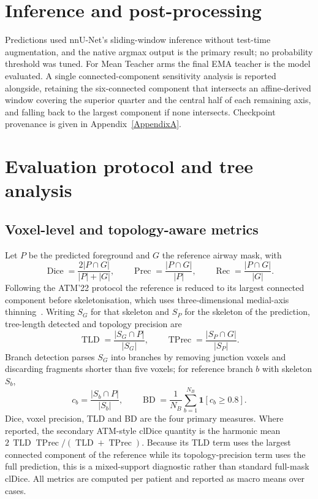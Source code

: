 \section{Inference and post-processing}

Predictions used nnU-Net's sliding-window inference without test-time augmentation, and the
native argmax output is the primary result; no probability threshold was tuned. For Mean
Teacher arms the final EMA teacher is the model evaluated. A single connected-component
sensitivity analysis is reported alongside, retaining the six-connected component that
intersects an affine-derived window covering the superior quarter and the central half of each
remaining axis, and falling back to the largest component if none intersects. Checkpoint
provenance is given in Appendix~\ref{AppendixA}.

\section{Evaluation protocol and tree analysis}
\label{sec:evaluation}

\subsection{Voxel-level and topology-aware metrics}

Let $P$ be the predicted foreground and $G$ the reference airway mask, with
\begin{equation}
  \operatorname{Dice}=\frac{2|P\cap G|}{|P|+|G|},
  \qquad
  \operatorname{Prec}=\frac{|P\cap G|}{|P|},
  \qquad
  \operatorname{Rec}=\frac{|P\cap G|}{|G|}.
  \label{eq:voxel}
\end{equation}
Following the ATM'22 protocol the reference is reduced to its largest connected component
before skeletonisation, which uses three-dimensional medial-axis thinning~\cite{lee1994thinning}. Writing $S_G$ for that skeleton and $S_P$ for the skeleton of the
prediction, tree-length detected and topology precision are
\begin{equation}
  \operatorname{TLD}=\frac{|S_G\cap P|}{|S_G|},
  \qquad
  \operatorname{TPrec}=\frac{|S_P\cap G|}{|S_P|}.
  \label{eq:tld}
\end{equation}
Branch detection parses $S_G$ into branches by removing junction
voxels and discarding fragments shorter than five voxels; for reference branch $b$ with
skeleton $S_b$,
\begin{equation}
  c_b=\frac{|S_b\cap P|}{|S_b|},
  \qquad
  \operatorname{BD}=\frac{1}{N_B}\sum_{b=1}^{N_B}\mathbf{1}\!\left[c_b\ge0.8\right].
  \label{eq:bd}
\end{equation}
Dice, voxel precision, TLD and BD are the four primary measures. Where reported, the secondary
ATM-style clDice quantity is the harmonic mean
$2\,\operatorname{TLD}\operatorname{TPrec}/
(\operatorname{TLD}+\operatorname{TPrec})$. Because its TLD term uses the largest connected
component of the reference while its topology-precision term uses the full prediction, this is
a mixed-support diagnostic rather than standard full-mask clDice. All metrics are computed per
patient and reported as macro means over cases.

